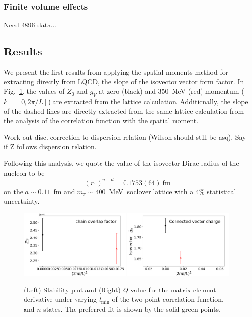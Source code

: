 \documentclass[prd,aps,twocolumn,superscriptaddress,tightenlines,nofootinbib,floatfix,preprintnumbers,10pt]{revtex4-1}
\begin{document}
\subsubsection{Finite volume effects}
{\color{red} Need 4896 data...}

\subsection{Results}
We present the first results from applying the spatial moments method for extracting directly from LQCD, the slope of the isovector vector form factor. In Fig.~\ref{fig:radius}, the values of $Z_0$ and $g_V$ at zero (black) and 350~MeV (red) momentum ($k=[0, 2\pi/L]$) are extracted from the lattice calculation. Additionally, the slope of the dashed lines are directly extracted from the same lattice calculation from the analysis of the correlation function with the spatial moment.

{\color{red} Work out disc. correction to dispersion relation (Wilson should still be asq). Say if Z follows dispersion relation.}


Following this analysis, we quote the value of the isovector Dirac radius of the nucleon to be
\begin{equation}
\left( r_1 \right) ^{u-d} = 0.1753(64)\ \mathrm{fm}
\end{equation}
on the $a\sim 0.11$~fm and $m_\pi \sim 400$~MeV isoclover lattice with a 4\% statistical uncertainty.

\begin{figure}[t]{
		\includegraphics[width=0.49\textwidth]{figures/Zs_chain.pdf}
		\includegraphics[width=0.49\textwidth]{figures/gV_chain.pdf}
		\caption{(Left) Stability plot and (Right) $Q$-value for the matrix element derivative under varying $t_{\mathrm{min}}$ of the two-point correlation function, and $n$-states. The preferred fit is shown by the solid green points.}
		\label{fig:radius}
}\end{figure}
\end{document}
